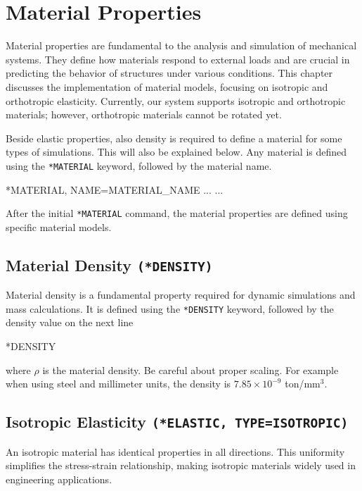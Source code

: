 \chapter{Material Properties}
\label{chap:material_properties}

Material properties are fundamental to the analysis and simulation of mechanical systems.
They define how materials respond to external loads and are crucial in predicting the behavior of structures under various conditions.
This chapter discusses the implementation of material models, focusing on isotropic and orthotropic elasticity.
Currently, our system supports isotropic and orthotropic materials; however, orthotropic materials cannot be rotated yet.

Beside elastic properties, also density is required to define a material for some types of simulations. This will also be explained below.
Any material is defined using the \texttt{*MATERIAL} keyword, followed by the material name.

\begin{codeBlock}
*MATERIAL, NAME=MATERIAL_NAME
...
...
\end{codeBlock}

After the initial \texttt{*MATERIAL} command, the material properties are defined using specific material models.

\section{Material Density \texttt{(*DENSITY)}}

Material density is a fundamental property required for dynamic simulations and mass calculations.
It is defined using the \texttt{*DENSITY} keyword, followed by the density value on the next line

\begin{codeBlock}
*DENSITY
\rho
\end{codeBlock}

where \(\rho\) is the material density. Be careful about proper scaling. For example when using steel and millimeter units,
the density is \(7.85 \times 10^{-9}\) ton/mm\(^3\).

\section{Isotropic Elasticity \texttt{(*ELASTIC, TYPE=ISOTROPIC)}}

An isotropic material has identical properties in all directions.
This uniformity simplifies the stress-strain relationship, making isotropic materials widely used in engineering applications.

